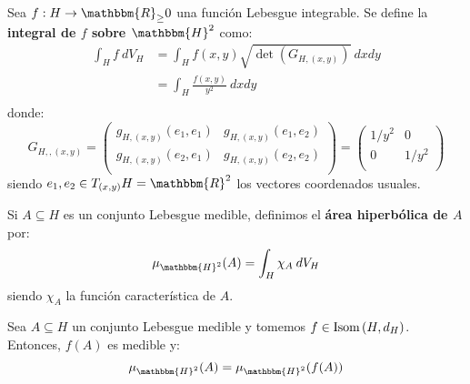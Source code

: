 \documentclass[12pt]{report}
\theoremstyle{largebreak}
\newcommand\cf[3]{\ensuremath{#1:#2\rightarrow#3}}
\newcommand{\bbm}[1]{\ensuremath{\mathbbm{#1}}}
\newcommand{\Isom}[1]{\ensuremath{\textup{Isom}\left(#1\right)}}
\begin{document}
    \begin{mydef}
        Sea $\cf{f}{H}{\bbm{R}_\geq0}$ una función Lebesgue integrable. Se define la \textbf{integral de $f$ sobre $\bbm{H}^2$} como:
        \begin{equation*}
            \begin{split}
                \int_{H}f\:dV_H&=\int_{H}f(x,y)\sqrt{\det(G_{H,(x,y)})}\:dxdy\\
                &=\int_{H}\frac{f(x,y)}{y^2}\:dxdy\\
            \end{split}
        \end{equation*}
        donde:
        \begin{equation*}
            G_{ H,,(x,y)}=\left(\begin{array}{cc}
                g_{ H,(x,y)}(e_1,e_1) & g_{ H,(x,y)}(e_1,e_2) \\
                g_{ H,(x,y)}(e_2,e_1) & g_{ H,(x,y)}(e_2,e_2) \\
            \end{array} \right)=\left(\begin{array}{cc}
                1/y^2 & 0 \\
                0 & 1/y^2 \\
            \end{array} \right)
        \end{equation*}
        siendo $e_1,e_2\in T_{(x,y)}H=\bbm{R}^2$ los vectores coordenados usuales.

        Si $A\subseteq H$ es un conjunto Lebesgue medible, definimos el \textbf{área hiperbólica de $A$} por:
        \begin{equation*}
            \mu_{\bbm{H}^2}(A)=\int_{H}\chi_A\:dV_H
        \end{equation*}
        siendo $\chi_A$ la función característica de $A$.
    \end{mydef}

    \begin{propo}
        Sea $A\subseteq H$ un conjunto Lebesgue medible y tomemos $f\in\Isom{H,d_H}$. Entonces, $f(A)$ es medible y:
        \begin{equation*}
            \mu_{\bbm{H}^2}(A)=\mu_{\bbm{H}^2}(f(A))
        \end{equation*}
    \end{propo}
\end{document}
